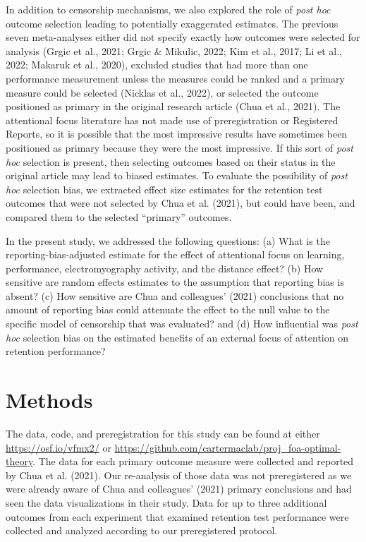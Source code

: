 \documentclass[
  11pt,
  doc, donotrepeattitle,floatsintext]{apa7}
\begin{document}
In addition to censorship mechanisms, we also explored the role of \emph{post hoc} outcome selection leading to potentially exaggerated estimates. The previous seven meta-analyses either did not specify exactly how outcomes were selected for analysis (Grgic et al., 2021; Grgic \& Mikulic, 2022; Kim et al., 2017; Li et al., 2022; Makaruk et al., 2020), excluded studies that had more than one performance measurement unless the measures could be ranked and a primary measure could be selected (Nicklas et al., 2022), or selected the outcome positioned as primary in the original research article (Chua et al., 2021). The attentional focus literature has not made use of preregistration or Registered Reports, so it is possible that the most impressive results have sometimes been positioned as primary because they were the most impressive. If this sort of \emph{post hoc} selection is present, then selecting outcomes based on their status in the original article may lead to biased estimates. To evaluate the possibility of \emph{post hoc} selection bias, we extracted effect size estimates for the retention test outcomes that were not selected by Chua et al. (2021), but could have been, and compared them to the selected ``primary'' outcomes.

In the present study, we addressed the following questions: (a) What is the reporting-bias-adjusted estimate for the effect of attentional focus on learning, performance, electromyography activity, and the distance effect? (b) How sensitive are random effects estimates to the assumption that reporting bias is absent? (c) How sensitive are Chua and colleagues' (2021) conclusions that no amount of reporting bias could attenuate the effect to the null value to the specific model of censorship that was evaluated? and (d) How influential was \emph{post hoc} selection bias on the estimated benefits of an external focus of attention on retention performance?

\hypertarget{methods}{%
\section{Methods}\label{methods}}

The data, code, and preregistration for this study can be found at either \url{https://osf.io/vfmx2/} or \url{https://github.com/cartermaclab/proj_foa-optimal-theory}. The data for each primary outcome measure were collected and reported by Chua et al. (2021). Our re-analysis of those data was not preregistered as we were already aware of Chua and colleagues' (2021) primary conclusions and had seen the data visualizations in their study. Data for up to three additional outcomes from each experiment that examined retention test performance were collected and analyzed according to our preregistered protocol.
\end{document}

